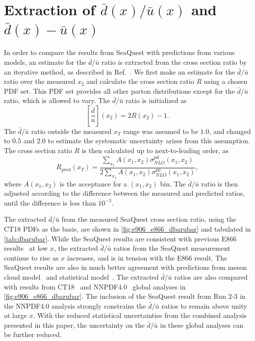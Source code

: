 \documentclass[reprint,aps,unsortedaddress,superscriptaddress,prl,floatfix,showpacs,linenumbers,final]{revtex4-2}
\begin{document}
\section{Extraction of \texorpdfstring{$\bar{d}\left(x\right)/\bar{u}\left(x\right)$}{dbar(x)/ubar(x)}
  and \texorpdfstring{$\bar{d}\left(x\right)-\bar{u}\left(x\right)$}{dbar(x)-ubar(x)}}
\label{sec:extraction}
In order to compare the results from SeaQuest with predictions from various models,
an estimate for the $\bar{d}/\bar{u}$ ratio is extracted from the cross section ratio by
an iterative method, as described in Ref.~\cite{dove2021}.
We first make an estimate for the $\bar{d}/\bar{u}$ ratio over the measured $x_2$
and calculate the cross section ratio $R$ using a chosen PDF set.
This PDF set provides all other parton distributions except for the $\bar{d}/\bar{u}$ ratio,
which is allowed to vary. The $\bar{d}/\bar{u}$ ratio is initialized as
\begin{equation}
	\left[\frac{\bar{d}}{\bar{u}}\right]\left(x_2\right) = 2R\left(x_2\right)-1.
\end{equation}
The $\bar{d}/\bar{u}$ ratio outside the measured $x_T$ range was assumed to be $1.0$,
and changed to $0.5$ and $2.0$ to estimate the systematic uncertainty arises from this assumption.
The cross section ratio $R$ is then calculated up to next-to-leading order, as
\begin{equation}
	R_{\mathrm{pred}}\left(x_T\right)  = \frac{\sum_{x_1} A\left(x_1, x_2\right)\sigma^{pd}_{NLO}\left(x_1, x_2\right)}{2\sum_{x_1} A\left(x_1, x_2\right)\sigma^{pp}_{NLO}\left(x_1, x_2\right)},
\end{equation}
where $A\left(x_1,x_2\right)$ is the acceptance for a $\left(x_1, x_2\right)$ bin.
The $\bar{d}/\bar{u}$ ratio is then adjusted according to the difference between
the measured and predicted ratios, until the difference is less than $10^{-3}$.

The extracted $\bar{d}/\bar{u}$ from the measured SeaQuest cross section ratio,
using the CT18 PDFs as the basis, are shown in \cref{fig:e906_e866_dbarubar}
and tabulated in \cref{tab:dbarubar}.
While the SeaQuest results are consistent with previous E866 results~\cite{towell2001} at low $x$,
the extracted $\bar{d}/\bar{u}$ ratios from the SeaQuest measurement continue to rise as $x$ increases,
and is in tension with the E866 result.
The SeaQuest results are also in much better agreement with predictions from meson cloud model~\cite{alberg2022}
and statistical model~\cite{soffer2019}.
The extracted $\bar{d}/\bar{u}$ ratios are also compared with results from CT18~\cite{hou2021} and NNPDF4.0~\cite{ball2022a}
global analyses in \cref{fig:e906_e866_dbarubar}.
The inclusion of the SeaQuest result from Run 2-3 in the NNPDF4.0 analysis strongly constrains the $\bar{d}/\bar{u}$ ratios
to remain above unity at large $x$.
With the reduced statistical uncertainties from the combined analysis presented in this paper,
the uncertainty on the $\bar{d}/\bar{u}$ in these global analyses can be further reduced.
\end{document}
